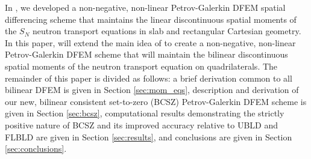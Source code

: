 \documentclass{mc2015}
\begin{document}
In \cite{csz_me}, we developed a non-negative, non-linear Petrov-Galerkin DFEM spatial differencing scheme that maintains the linear discontinuous spatial moments of the $S_N$ neutron transport equations in slab and rectangular Cartesian geometry.  
In this paper, will extend the main idea of \cite{csz_me} to create a non-negative, non-linear Petrov-Galerkin DFEM scheme that will maintain the bilinear discontinuous spatial moments of the neutron transport equation on quadrilaterals.
The remainder of this paper is divided as follows: a brief derivation common to all bilinear DFEM is given in Section \ref{sec:mom_eqs}, description and derivation of our new, bilinear consistent set-to-zero (BCSZ) Petrov-Galerkin DFEM scheme is given in Section \ref{sec:bcsz},  computational results demonstrating the strictly positive nature of BCSZ and its improved accuracy relative to UBLD and FLBLD are given in Section \ref{sec:results}, and conclusions are given in Section \ref{sec:conclusions}.
\end{document}

